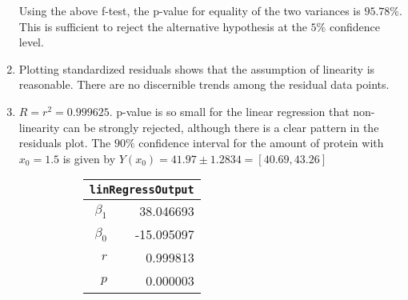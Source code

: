 \begin{enumerate}
Using the above f-test, the p-value for equality of the two variances is $ 95.78\% $. This is sufficient to reject the alternative hypothesis at the $ 5\% $ confidence level.

\item Plotting standardized residuals shows that the assumption of linearity is reasonable. There are no discernible trends among the residual data points.

\begin{figure}[H]
	\centering
\end{figure}

\item $ R = r^2 = 0.999625 $.
p-value is so small for the linear regression that non-linearity can be strongly rejected, although there is a clear pattern in the residuals plot.
The $ 90\% $ confidence interval for the amount of protein with $ x_0 = 1.5 $ is given by
$ Y(x_0) = 41.97 \pm 1.2834 = [40.69, 43.26] $\\

\begin{figure}[H]
	\begin{subfigure}[]{0.2\linewidth}
		\centering
		\begin{tabular}{@{}rr@{}}
			\toprule
			\multicolumn{2}{c}{\texttt{linRegressOutput}} \\
			\midrule
			$\beta_1$     &        38.046693 \\
			$\beta_0$ &       -15.095097 \\
			$r$    &         0.999813 \\
			$p$    &         0.000003 \\
			\bottomrule
		\end{tabular}
		
	\end{subfigure}
	\begin{subfigure}[]{0.8\linewidth}
		\centering
		
	\end{subfigure}
\end{figure}


\end{enumerate}
